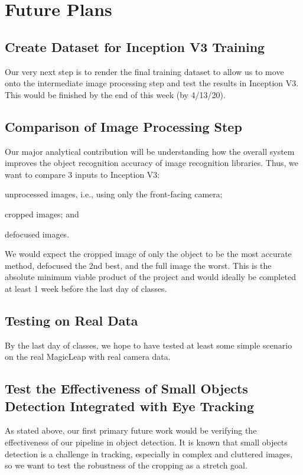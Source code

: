 \section{Future Plans}


\subsection{Create Dataset for Inception V3 Training}

Our very next step is to render the final training dataset to allow us to move
onto the intermediate image processing step and test the results in Inception
V3. This would be finished by the end of this week (by 4/13/20).

\subsection{Comparison of Image Processing Step}

Our major analytical contribution will be understanding how the overall system
improves the object recognition accuracy of image recognition libraries. Thus,
we want to compare 3 inputs to Inception V3:
\begin{inlist}
\item unprocessed images, i.e., using only the front-facing camera;
\item cropped images; and
\item defocused images.
\end{inlist}
We would expect the cropped image of only the object to be the most accurate
method, defocused the 2nd best, and the full image the worst. This is the
absolute minimum viable product of the project and would ideally be completed at
least 1 week before the last day of classes.

\subsection{Testing on Real Data}

By the last day of classes, we hope to have tested at least some simple scenario
on the real MagicLeap with real camera data.

\subsection{Test the Effectiveness of Small Objects Detection Integrated with Eye Tracking}

As stated above, our first primary future work would be verifying the
effectiveness of our pipeline in object detection. It is known that small
objects detection is a challenge in tracking, especially in complex and
cluttered images, so we want to test the robustness of the cropping as a stretch
goal.
